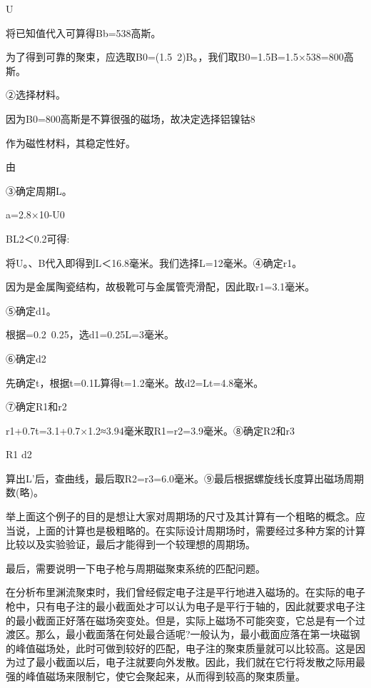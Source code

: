 U


将已知值代入可算得Bb=538高斯。


为了得到可靠的聚束，应选取B0=(1.5~2)B。，我们取B0=1.5B=1.5×538=800高斯。


②选择材料。


因为B0=800高斯是不算很强的磁场，故决定选择铝镍钴8


作为磁性材料，其稳定性好。


由 

③确定周期L。


a=2.8×10-U0


BL2＜0.2可得:



将U。、B代入即得到L＜16.8毫米。我们选择L=12毫米。④确定r1。


因为是金属陶瓷结构，故极靴可与金属管壳滑配，因此取r1=3.1毫米。


⑤确定d1。


根据=0.2~0.25，选d1=0.25L=3毫米。


⑥确定d2


先确定t，根据t=0.1L算得t=1.2毫米。故d2=Lt=4.8毫米。


⑦确定R1和r2


r1+0.7t=3.1+0.7×1.2≈3.94毫米取R1=r2=3.9毫米。⑧确定R2和r3


R1 d2


算出L’后，查曲线，最后取R2=r3=6.0毫米。⑨最后根据螺旋线长度算出磁场周期数(略)。


举上面这个例子的目的是想让大家对周期场的尺寸及其计算有一个粗略的概念。应当说，上面的计算也是极粗略的。在实际设计周期场时，需要经过多种方案的计算比较以及实验验证，最后才能得到一个较理想的周期场。


最后，需要说明一下电子枪与周期磁聚束系统的匹配问题。


在分析布里渊流聚束时，我们曾经假定电子注是平行地进入磁场的。在实际的电子枪中，只有电子注的最小截面处才可以认为电子是平行于轴的，因此就要求电子注的最小截面正好落在磁场突变处。但是，实际上磁场不可能突变，它总是有一个过渡区。那么，最小截面落在何处最合适呢?一般认为，最小截面应落在第一块磁钢的峰值磁场处，此时可做到较好的匹配，电子注的聚束质量就可以比较高。这是因为过了最小截面以后，电子注就要向外发散。因此，我们就在它行将发散之际用最强的峰值磁场来限制它，使它会聚起来，从而得到较高的聚束质量。








